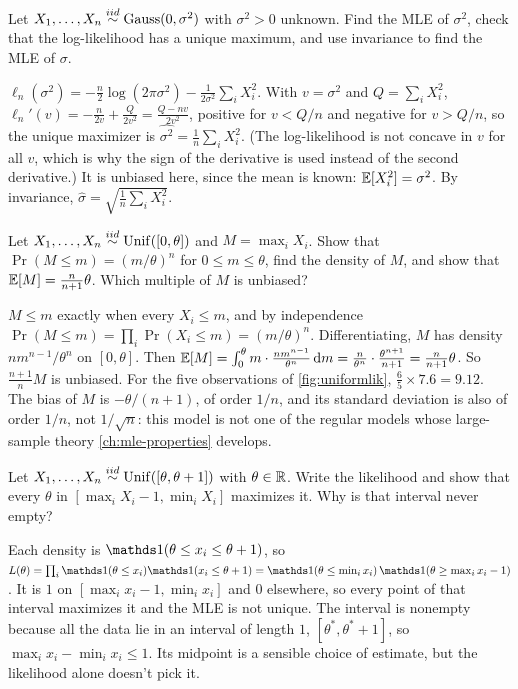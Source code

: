 \begin{exercise}
\label{ex:lik-gauss-known-mean}
Let $X_1, \ldots, X_n \stackrel{iid}{\sim} \text{Gauss}(0, \sigma^2)$ with $\sigma^2 > 0$ unknown. Find the MLE of $\sigma^2$, check that the log-likelihood has a unique maximum, and use invariance to find the MLE of $\sigma$.
\end{exercise}
\begin{solution}
$\ell_n(\sigma^2) = -\frac{n}{2}\log(2\pi\sigma^2) - \frac{1}{2\sigma^2}\sum_i X_i^2$. With $v = \sigma^2$ and $Q = \sum_i X_i^2$, $\ell_n'(v) = -\frac{n}{2v} + \frac{Q}{2v^2} = \frac{Q - nv}{2v^2}$, positive for $v < Q/n$ and negative for $v > Q/n$, so the unique maximizer is $\widehat{\sigma^2} = \frac1n\sum_i X_i^2$. (The log-likelihood is not concave in $v$ for all $v$, which is why the sign of the derivative is used instead of the second derivative.) It is unbiased here, since the mean is known: $\operatorname*{\mathbb{E}}[X_i^2] = \sigma^2$. By invariance, $\hat{\sigma} = \sqrt{\frac1n\sum_i X_i^2}$.
\end{solution}

\begin{exercise}
\label{ex:lik-uniform}
Let $X_1, \ldots, X_n \stackrel{iid}{\sim} \mathrm{Unif}([0, \theta])$ and $M = \max_i X_i$. Show that $\Pr(M \leq m) = (m/\theta)^n$ for $0 \leq m \leq \theta$, find the density of $M$, and show that $\operatorname*{\mathbb{E}}[M] = \frac{n}{n+1}\theta$. Which multiple of $M$ is unbiased?
\end{exercise}
\begin{solution}
$M \leq m$ exactly when every $X_i \leq m$, and by independence $\Pr(M \leq m) = \prod_i \Pr(X_i \leq m) = (m/\theta)^n$. Differentiating, $M$ has density $n m^{n-1}/\theta^n$ on $[0, \theta]$. Then $\operatorname*{\mathbb{E}}[M] = \int_0^\theta m \cdot \frac{n m^{n-1}}{\theta^n}\, \mathrm{d}m = \frac{n}{\theta^n}\cdot\frac{\theta^{n+1}}{n+1} = \frac{n}{n+1}\theta$. So $\frac{n+1}{n}M$ is unbiased. For the five observations of \cref{fig:uniformlik}, $\frac65 \times 7.6 = 9.12$. The bias of $M$ is $-\theta/(n+1)$, of order $1/n$, and its standard deviation is also of order $1/n$, not $1/\sqrt{n}$: this model is not one of the regular models whose large-sample theory \cref{ch:mle-properties} develops.
\end{solution}

\begin{exercise}
\label{ex:lik-unif-shift}
Let $X_1, \ldots, X_n \stackrel{iid}{\sim} \mathrm{Unif}([\theta, \theta + 1])$ with $\theta \in \mathbb{R}$. Write the likelihood and show that every $\theta$ in $[\max_i X_i - 1, \min_i X_i]$ maximizes it. Why is that interval never empty?
\end{exercise}
\begin{solution}
Each density is $\ind(\theta \leq x_i \leq \theta + 1)$, so $L(\theta) = \prod_i \ind(\theta \leq x_i)\ind(x_i \leq \theta + 1) = \ind(\theta \leq \min_i x_i)\,\ind(\theta \geq \max_i x_i - 1)$. It is $1$ on $[\max_i x_i - 1, \min_i x_i]$ and $0$ elsewhere, so every point of that interval maximizes it and the MLE is not unique. The interval is nonempty because all the data lie in an interval of length $1$, $[\theta^*, \theta^* + 1]$, so $\max_i x_i - \min_i x_i \leq 1$. Its midpoint is a sensible choice of estimate, but the likelihood alone doesn't pick it.
\end{solution}

